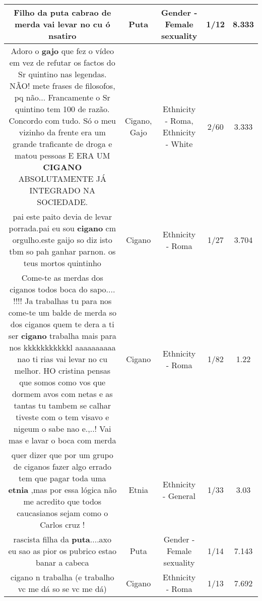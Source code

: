 \documentclass[11pt]{article}
\newlength\mylength
\begin{document}
\begin{center}
\begin{longtable}{|C{.65\mylength}|C{.30\mylength}|C{.12\mylength}|C{.12\mylength}|C{.12\mylength}|}
  \small Filho da \textbf{puta} cabrao  de merda vai levar no cu ó nsatiro\normalsize   & Puta & Gender - Female sexuality & 1/12 & 8.333 \\  \hline
  \small Adoro o \textbf{gajo} que fez o vídeo em vez de refutar os factos do Sr quintino nas legendas. NÃO! mete frases de filosofos, pq não... Francamente o Sr quintino tem 100 de razão. Concordo com tudo. Só o meu vizinho da frente era um grande traficante de droga e matou pessoas E ERA UM \textbf{CIGANO} ABSOLUTAMENTE JÁ INTEGRADO NA SOCIEDADE.\normalsize   & Cigano, Gajo & Ethnicity - Roma, Ethnicity - White & 2/60 & 3.333 \\  \hline
  \small pai este paito devia de levar porrada.pai eu sou \textbf{cigano} cm orgulho.este gaijo so diz isto tbm so pah ganhar parnon. os teus mortos quintinho\normalsize   & Cigano & Ethnicity - Roma & 1/27 & 3.704 \\  \hline
  \small Come-te as merdas dos ciganos todos boca do sapo.... !!!! Ja trabalhas tu para nos come-te um balde de merda so dos ciganos quem te dera a ti ser \textbf{cigano} trabalha mais para nos kkkkkkkkkkkl aaaaaaaaaa nao ti rias vai levar no cu melhor.  HO cristina pensas que  somos como vos que dormem avos com netas e as tantas tu tambem se calhar tiveste com o tem visavo e nigeum o sabe nao e.,..! Vai mas e lavar o boca com merda\normalsize   & Cigano & Ethnicity - Roma & 1/82 & 1.22 \\  \hline
  \small quer dizer que por um grupo de ciganos fazer algo errado tem que pagar toda uma \textbf{etnia} ,mas por essa lógica não me acredito que todos caucasianos sejam como o Carlos cruz !\normalsize   & Etnia & Ethnicity - General & 1/33 & 3.03 \\  \hline
  \small rascista filha da \textbf{puta}....axo eu sao as pior os pubrico estao banar a cabeca\normalsize   & Puta & Gender - Female sexuality & 1/14 & 7.143 \\  \hline
  \small cigano n trabalha (e trabalho vc me dá so se vc me dá)\normalsize   & Cigano & Ethnicity - Roma & 1/13 & 7.692 \\  \hline

\end{longtable}
\end{center}
\end{document}
